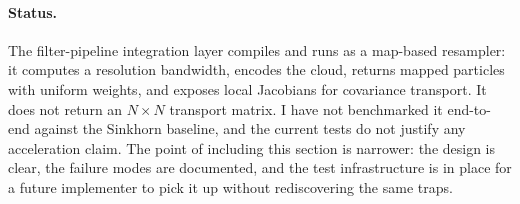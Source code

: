 \paragraph{Status.}
The filter-pipeline integration layer compiles and runs as a map-based resampler: it computes a resolution bandwidth, encodes the cloud, returns mapped particles with uniform weights, and exposes local Jacobians for covariance transport. It does not return an $N\times N$ transport matrix. I have not benchmarked it end-to-end against the Sinkhorn baseline, and the current tests do not justify any acceleration claim. The point of including this section is narrower: the design is clear, the failure modes are documented, and the test infrastructure is in place for a future implementer to pick it up without rediscovering the same traps.

